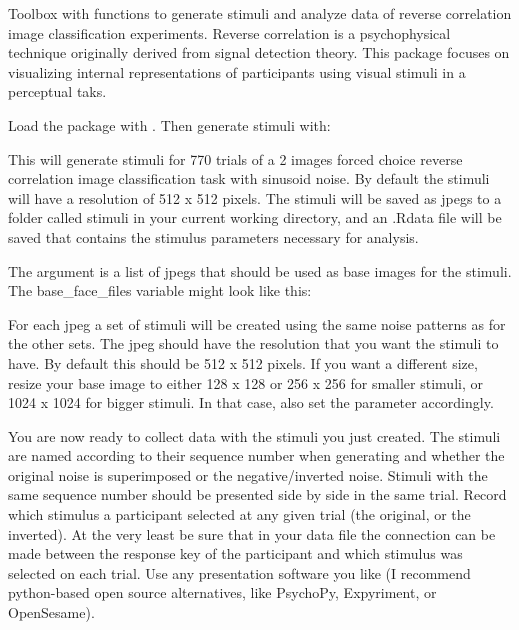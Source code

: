 \documentclass[letterpaper]{book}
\begin{document}
%
\begin{Description}
Toolbox with functions to generate stimuli and analyze data of reverse correlation image classification experiments. Reverse correlation is a psychophysical technique originally derived from signal detection theory. This package focuses on visualizing internal representations of participants using visual stimuli in a perceptual taks.
\end{Description}
%
\begin{Details}


Load the package with . Then generate stimuli with:


This will generate stimuli for 770 trials of a 2 images forced choice reverse correlation image classification task with sinusoid noise. By default the stimuli will have a resolution of 512 x 512 pixels. The stimuli will be saved as jpegs to a folder called stimuli in your current working directory, and an .Rdata file will be saved that contains the stimulus parameters necessary for analysis.

The  argument is a list of jpegs that should be used as base images for the stimuli. The base\_face\_files variable might look like this:


For each jpeg a set of stimuli will be created using the same noise patterns as for the other sets. The jpeg should have the resolution that you want the stimuli to have. By default this should be 512 x 512 pixels. If you want a different size, resize your base image to either 128 x 128 or 256 x 256 for smaller stimuli, or 1024 x 1024 for bigger stimuli. In that case, also set the  parameter accordingly.

You are now ready to collect data with the stimuli you just created. The stimuli are named according to their sequence number when generating and whether the original noise is superimposed or the negative/inverted noise. Stimuli with the same sequence number should be presented side by side in the same trial. Record which stimulus a participant selected at any given trial (the original, or the inverted). At the very least be sure that in your data file the connection can be made between the response key of the participant and which stimulus was selected on each trial. Use any presentation software you like (I recommend python-based open source alternatives, like PsychoPy, Expyriment, or OpenSesame).


\end{Details}
\end{document}
